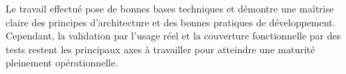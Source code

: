 Le travail effectué pose de bonnes bases techniques et démontre une maîtrise claire des principes d’architecture et des bonnes pratiques de développement.
Cependant, la validation par l’usage réel et la couverture fonctionnelle par des tests restent les principaux axes à travailler pour atteindre une maturité pleinement opérationnelle.
